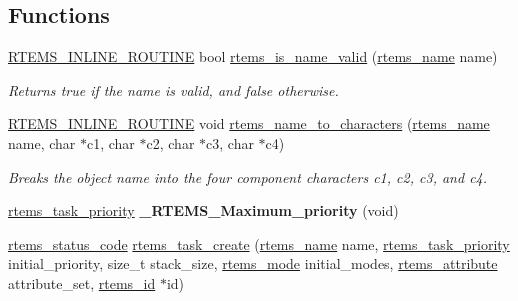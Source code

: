\subsection*{Functions}
\begin{DoxyCompactItemize}
\item 
\mbox{\label{group__ClassicTasks_ga18cea13f764d37604f3cf92183d2106b}} 
\mbox{\hyperlink{group__RTEMSScoreBaseDefs_gac216239df231d5dbd15e3520b0b9313f}{R\+T\+E\+M\+S\+\_\+\+I\+N\+L\+I\+N\+E\+\_\+\+R\+O\+U\+T\+I\+NE}} bool \mbox{\hyperlink{group__ClassicTasks_ga18cea13f764d37604f3cf92183d2106b}{rtems\+\_\+is\+\_\+name\+\_\+valid}} (\mbox{\hyperlink{group__ClassicTasks_ga55fb63c49f68c0cbd9bee004da15b1fd}{rtems\+\_\+name}} name)
\begin{DoxyCompactList}\small\item\em Returns {\ttfamily true} if the name is valid, and {\ttfamily false} otherwise. \end{DoxyCompactList}\item 
\mbox{\label{group__ClassicTasks_ga38b1f7c417f9cc43ca6b722a05dd2d06}} 
\mbox{\hyperlink{group__RTEMSScoreBaseDefs_gac216239df231d5dbd15e3520b0b9313f}{R\+T\+E\+M\+S\+\_\+\+I\+N\+L\+I\+N\+E\+\_\+\+R\+O\+U\+T\+I\+NE}} void \mbox{\hyperlink{group__ClassicTasks_ga38b1f7c417f9cc43ca6b722a05dd2d06}{rtems\+\_\+name\+\_\+to\+\_\+characters}} (\mbox{\hyperlink{group__ClassicTasks_ga55fb63c49f68c0cbd9bee004da15b1fd}{rtems\+\_\+name}} name, char $\ast$c1, char $\ast$c2, char $\ast$c3, char $\ast$c4)
\begin{DoxyCompactList}\small\item\em Breaks the object name into the four component characters {\itshape c1}, {\itshape c2}, {\itshape c3}, and {\itshape c4}. \end{DoxyCompactList}\item 
\mbox{\label{group__ClassicTasks_gab1171019ec5a1323bc4cf6227053bd4e}} 
\mbox{\hyperlink{group__ClassicTasks_gaa80a0c0938307d1e99d0eb5fee765b47}{rtems\+\_\+task\+\_\+priority}} {\bfseries \+\_\+\+R\+T\+E\+M\+S\+\_\+\+Maximum\+\_\+priority} (void)
\item 
\mbox{\hyperlink{group__ClassicStatus_ga545d41846817eaba6143d52ee4d9e9fe}{rtems\+\_\+status\+\_\+code}} \mbox{\hyperlink{group__ClassicTasks_gabffda1c2301962f0ae5af042ac0bba62}{rtems\+\_\+task\+\_\+create}} (\mbox{\hyperlink{group__ClassicTasks_ga55fb63c49f68c0cbd9bee004da15b1fd}{rtems\+\_\+name}} name, \mbox{\hyperlink{group__ClassicTasks_gaa80a0c0938307d1e99d0eb5fee765b47}{rtems\+\_\+task\+\_\+priority}} initial\+\_\+priority, size\+\_\+t stack\+\_\+size, \mbox{\hyperlink{group__ClassicModes_ga8d46a41a837840dc97336fdcd20e4f68}{rtems\+\_\+mode}} initial\+\_\+modes, \mbox{\hyperlink{group__ClassicAttributes_gaea40313cf78ed843e09c4315d0a10f79}{rtems\+\_\+attribute}} attribute\+\_\+set, \mbox{\hyperlink{group__ClassicTasks_gab20892b814dced7dd4e5b9bf42becd57}{rtems\+\_\+id}} $\ast$id)

\end{DoxyCompactItemize}
